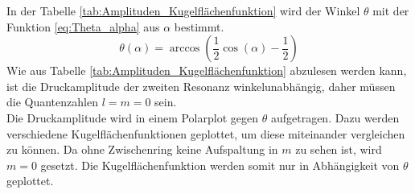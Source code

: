 \FloatBarrier
In der Tabelle \ref{tab:Amplituden_Kugelflächenfunktion} wird der Winkel $\theta$ mit der Funktion \eqref{eq:Theta_alpha} aus $\alpha$ bestimmt.
\begin{equation}
    \label{eq:Theta_alpha}
    \theta(\alpha) = \arccos\left( \frac{1}{2} \cos\left( \alpha \right) -\frac{1}{2} \right)
\end{equation}
Wie aus Tabelle \ref{tab:Amplituden_Kugelflächenfunktion} abzulesen werden kann, ist die Druckamplitude der zweiten Resonanz 
winkelunabhängig, daher müssen die Quantenzahlen $l=m=0$ sein.\\
Die Druckamplitude wird in einem Polarplot gegen $\theta$ aufgetragen. Dazu werden verschiedene Kugelflächenfunktionen 
geplottet, um diese miteinander vergleichen zu können. Da ohne Zwischenring keine Aufspaltung in $m$ zu sehen ist, wird $m=0$ gesetzt.
Die Kugelflächenfunktion werden somit nur in Abhängigkeit von $\theta$ geplottet.
\FloatBarrier
